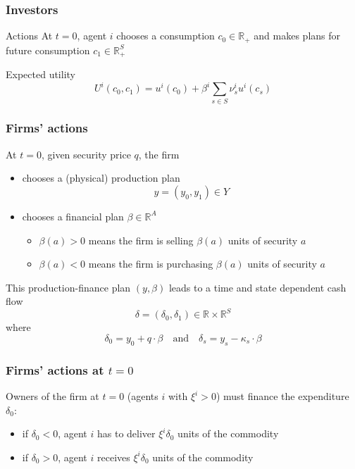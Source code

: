 \documentclass[blue]{beamer}
\def\R{\mathbb{R}}
\def\et{\quad \textrm{and} \quad}
\theoremstyle{definition}
\theoremstyle{example}
\begin{document}

\begin{frame}\frametitle{Investors}

\begin{block}{Actions}
At $t=0$, agent $i$ chooses a consumption $c_0 \in \R_+$ and makes plans for future consumption $c_1\in \R^S_+$
\end{block}

\begin{block}{Expected utility}
\[
U^i(c_0,c_1) = u^i(c_0) + \beta^i \sum_{s\in S} \nu^i_s u^i(c_s)
\]
\end{block}

\end{frame}


\begin{frame}\frametitle{Firms' actions}

At $t=0$, given security price $q$, the firm
    \begin{itemize}
    \item chooses a (physical) production plan $$y=(y_0,y_1) \in Y$$
    \item chooses a financial plan $\beta \in \R^A$
        \begin{itemize}
        \item $\beta(a) >0 $ means the firm is selling $\beta(a)$ units of security $a$
        \item $\beta(a) < 0 $ means the firm is purchasing $\beta(a)$ units of security $a$
        \end{itemize}
    \end{itemize}
This production-finance plan $(y,\beta)$ leads to a time and state dependent cash flow
\[
\delta = (\delta_0,\delta_1) \in \R \times \R^S
\]
where
\[
\delta_0 = y_0 + q \cdot \beta \et \delta_s = y_s - \kappa_s\cdot \beta
\]

\end{frame}



\begin{frame}\frametitle{Firms' actions at $t=0$}

Owners of the firm at $t=0$ (agents $i$ with $\xi^i >0$) must finance the expenditure $\delta_0$:
    \begin{itemize}
    \item if $\delta_0 <0$, agent $i$ has to deliver $\xi^i \delta_0$ units of the commodity
    \item if $\delta_0 > 0$, agent $i$ receives $\xi^i \delta_0$ units of the commodity
    \end{itemize}

\end{frame}
\end{document}
